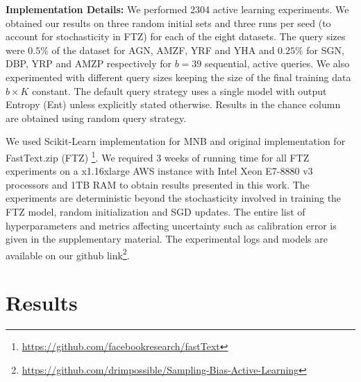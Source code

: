 \documentclass[11pt,a4paper]{article}
\begin{document}
\begin{table}[t]
    \centering
    \caption{Comparison of active text classification datasets and models (Acc on Trec-QA) used in \cite{siddhant2018deep} and our work. We use significantly larger datasets (two orders larger), perform 20x more experiments, and use more efficient and accurate models.}
    \label{tab:comparison_datasets}
\end{table}

\textbf{Implementation Details:} We performed 2304 active learning experiments. We obtained our results on three random initial sets and three runs per seed (to account for stochasticity in FTZ) for each of the eight datasets. The query sizes were $0.5\%$ of the dataset for AGN, AMZF, YRF and YHA and $0.25\%$ for SGN, DBP, YRP and AMZP respectively for $b=39$ sequential, active queries. We also experimented with different query sizes keeping the size of the final training data $b \times K$ constant. The default query strategy uses a single model with output Entropy (Ent) unless explicitly stated otherwise. Results in the chance column are obtained using random query strategy.

We used Scikit-Learn \cite{scikitlearn} implementation for MNB and original implementation for FastText.zip (FTZ)  \footnote{\url{https://github.com/facebookresearch/fastText}}. 
We required 3 weeks of running time for all FTZ experiments on a x1.16xlarge AWS instance with Intel Xeon E7-8880 v3 processors and 1TB RAM to obtain results presented in this work. The experiments are deterministic beyond the stochasticity involved in training the FTZ model, random initialization and SGD updates. The entire list of hyperparameters and metrics affecting uncertainty such as calibration error \cite{guo2017calibration} is given in the supplementary material. The experimental logs and models are available on our github link\footnote{\href{https://github.com/drimpossible/Sampling-Bias-Active-Learning}{https://github.com/drimpossible/Sampling-Bias-Active-Learning}}.  \section{Results}\label{sec:results}
\end{document}
